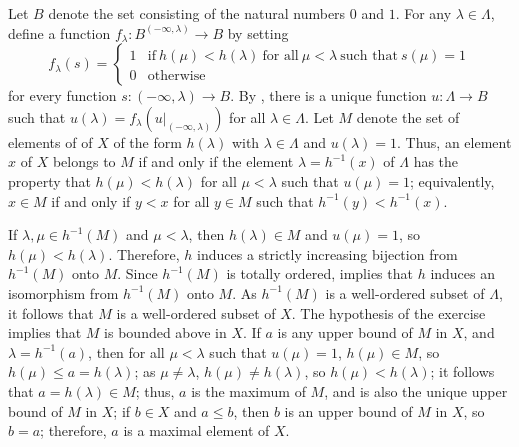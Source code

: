 \documentclass{article}
\begin{document}
\begin{solution}[\ref{exe:5qa65h5w}]
  \label{sol:s0vlfhkj}
  Let \(B\) denote the set consisting of the natural numbers \(0\) and
  \(1\).  For any \(\lambda \in \Lambda\), define a function
  \(f_\lambda : B^{(-\infty, \lambda)} \to B\) by setting
  \begin{displaymath}
    f_\lambda(s) =
    \begin{cases}
      1
      & \text{if} ~ h(\mu) < h(\lambda) ~ \text{for all}
        ~ \mu < \lambda ~ \text{such that} ~ s(\mu) = 1 \\
      0
      & \text{otherwise}
    \end{cases}
  \end{displaymath}
  for every function \(s : (-\infty, \lambda) \to B\).  By
  , there is a unique function
  \(u : \Lambda \to B\) such that
  \(u(\lambda) = f_\lambda(u \vert_{(-\infty, \lambda)})\) for all
  \(\lambda \in \Lambda\).  Let \(M\) denote the set of elements of of
  \(X\) of the form \(h(\lambda)\) with \(\lambda \in \Lambda\) and
  \(u(\lambda) = 1\).  Thus, an element \(x\) of \(X\) belongs to
  \(M\) if and only if the element \(\lambda = h^{-1}(x)\) of
  \(\Lambda\) has the property that \(h(\mu) < h(\lambda)\) for all
  \(\mu < \lambda\) such that \(u(\mu) = 1\); equivalently,
  \(x \in M\) if and only if \(y < x\) for all \(y \in M\) such that
  \(h^{-1}(y) < h^{-1}(x)\).

  If \(\lambda,\mu \in h^{-1}(M)\) and \(\mu < \lambda\), then
  \(h(\lambda) \in M\) and \(u(\mu) = 1\), so \(h(\mu) < h(\lambda)\).
  Therefore, \(h\) induces a strictly increasing bijection from
  \(h^{-1}(M)\) onto \(M\).  Since \(h^{-1}(M)\) is totally ordered,
   implies that \(h\) induces an isomorphism from
  \(h^{-1}(M)\) onto \(M\).  As \(h^{-1}(M)\) is a well-ordered subset
  of \(\Lambda\), it follows that \(M\) is a well-ordered subset of
  \(X\).  The hypothesis of the exercise implies that \(M\) is bounded
  above in \(X\).  If \(a\) is any upper bound of \(M\) in \(X\), and
  \(\lambda = h^{-1}(a)\), then for all
  \(\mu < \lambda\) such that \(u(\mu) = 1\), \(h(\mu) \in M\), so
  \(h(\mu) \leq a = h(\lambda)\); as \(\mu \neq \lambda\),
  \(h(\mu) \neq h(\lambda)\), so \(h(\mu) < h(\lambda)\); it follows
  that \(a = h(\lambda) \in M\); thus, \(a\) is the maximum of \(M\),
  and is also the unique upper bound of \(M\) in \(X\); if \(b \in X\)
  and \(a \leq b\), then \(b\) is an upper bound of \(M\) in \(X\), so
  \(b = a\); therefore, \(a\) is a maximal element of \(X\).
\end{solution}
\end{document}
